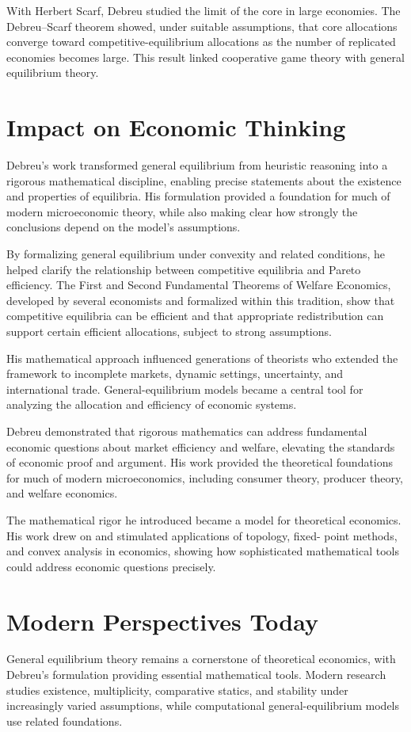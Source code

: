 With Herbert Scarf, Debreu studied the limit of the core in large economies.
The Debreu--Scarf theorem showed, under suitable assumptions, that core
allocations converge toward competitive-equilibrium allocations as the number
of replicated economies becomes large. This result linked cooperative game
theory with general equilibrium theory.

\section{Impact on Economic Thinking}
Debreu's work transformed general equilibrium from heuristic reasoning into a
rigorous mathematical discipline, enabling precise statements about the
existence and properties of equilibria. His formulation provided a foundation
for much of modern microeconomic theory, while also making clear how strongly
the conclusions depend on the model's assumptions.

By formalizing general equilibrium under convexity and related conditions, he
helped clarify the relationship between competitive equilibria and Pareto
efficiency. The First and Second Fundamental Theorems of Welfare Economics,
developed by several economists and formalized within this tradition, show
that competitive equilibria can be efficient and that appropriate
redistribution can support certain efficient allocations, subject to strong
assumptions.

His mathematical approach influenced generations of theorists who extended the
framework to incomplete markets, dynamic settings, uncertainty, and
international trade. General-equilibrium models became a central tool for
analyzing the allocation and efficiency of economic systems.

Debreu demonstrated that rigorous mathematics can address fundamental economic questions
about market efficiency and welfare, elevating the standards of economic proof and argument.
His work provided the theoretical foundations for much of modern microeconomics, including
consumer theory, producer theory, and welfare economics.

The mathematical rigor he introduced became a model for theoretical
economics. His work drew on and stimulated applications of topology, fixed-
point methods, and convex analysis in economics, showing how sophisticated
mathematical tools could address economic questions precisely.

\section{Modern Perspectives Today}
General equilibrium theory remains a cornerstone of theoretical economics,
with Debreu's formulation providing essential mathematical tools. Modern
research studies existence, multiplicity, comparative statics, and stability
under increasingly varied assumptions, while computational general-equilibrium
models use related foundations.

